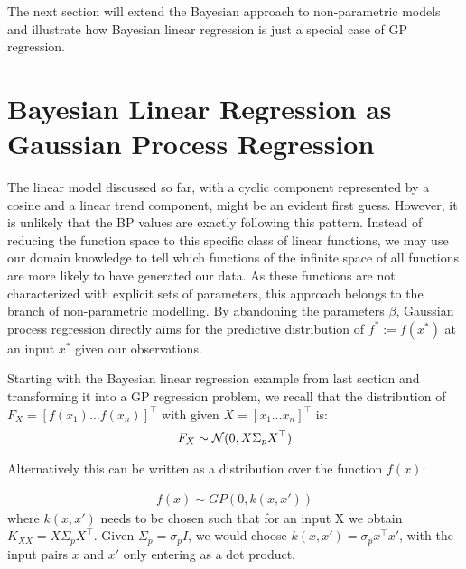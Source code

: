 The next section will extend the Bayesian approach to non-parametric models and illustrate how Bayesian linear
regression is just a special case of GP regression.

\section{Bayesian Linear Regression as Gaussian Process Regression}\label{sec:gaussian-process-regression}
The linear model discussed so far, with a cyclic component represented by a cosine and a linear trend component,
might be an evident first guess.
However, it is unlikely that the BP values are exactly following this pattern.
Instead of reducing the function space to this specific class of linear functions, we may use our domain knowledge
to tell which functions of the infinite space of all functions are more likely to have generated our data.
As these functions are not characterized with explicit sets of
parameters, this approach belongs to the branch of non-parametric modelling.
By abandoning the parameters $\beta$, Gaussian process regression
directly aims for the predictive distribution of $f^{\ast} := f(x^{\ast})$ at an input $x^{\ast}$ given our observations.

Starting with the Bayesian linear regression example from last section and transforming it into a GP regression
problem, we recall that the distribution of $F_X = [f(x_1) \dots f(x_n)]^{\top}$ with given $X = [x_1 \dots x_n]^{\top}$ is:
\begin{gather*}
    F_X \sim \operatorname{\mathcal{N}}(0,  X \Sigma_p X^{\top})
\end{gather*}

Alternatively this can be written as a distribution over the function $f(x)$:

\begin{gather*}
    f(x) \sim GP(0, k(x, x'))
\end{gather*}
where $k(x,x')$ needs to be chosen such that for an input X we obtain $K_{XX} =  X \Sigma_p X^{\top}$.
Given $\Sigma_p = \sigma_p I$, we would choose $k(x,x') = \sigma_p x^{\top} x'$, with the
input pairs $x$ and $x'$ only entering as a dot product.




